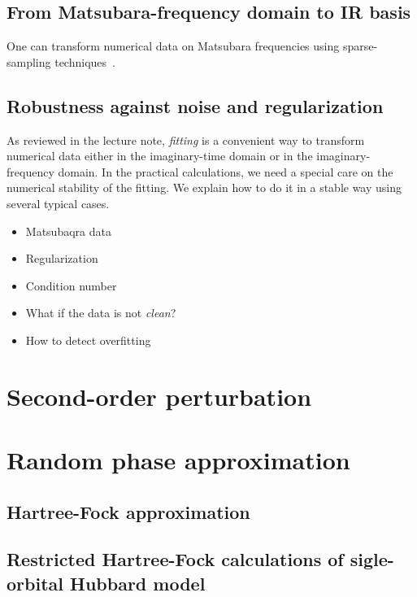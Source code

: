 \documentclass[submission, LectureNotes]{SciPost}
\begin{document}
\subsection{From Matsubara-frequency domain to IR basis}
One can transform numerical data on Matsubara frequencies using sparse-sampling techniques~\cite{Li:2020eu}.


\subsection{Robustness against noise and regularization}

As reviewed in the lecture note, \textit{fitting} is a convenient way to transform numerical data either in the imaginary-time domain or in the imaginary-frequency domain.
In the practical calculations, we need a special care on the numerical stability of the fitting.
We explain how to do it in a stable way using several typical cases.

\begin{itemize}
    \item Matsubaqra data
    \item Regularization
    \item Condition number
    \item What if the data is not \textit{clean}?
    \item How to detect overfitting
\end{itemize}

\clearpage
\section{Second-order perturbation}

\clearpage
\section{Random phase approximation}
\subsection{Hartree-Fock approximation}
\clearpage
\subsection{Restricted Hartree-Fock calculations of sigle-orbital Hubbard model}
\end{document}

